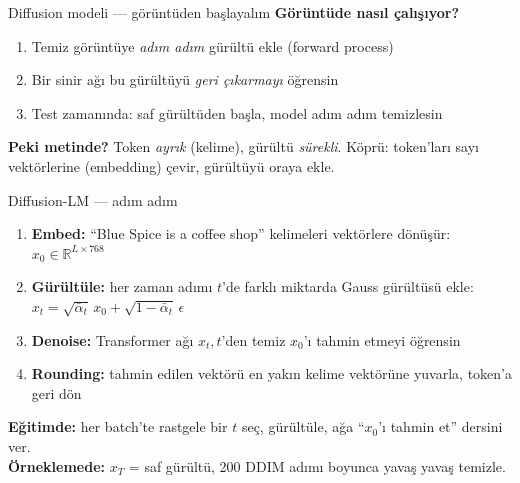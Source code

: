 \documentclass[10pt,aspectratio=169]{beamer}
\begin{document}
\begin{frame}{Diffusion modeli --- görüntüden başlayalım}
  \textbf{Görüntüde nasıl çalışıyor?}
  \vspace{0.4em}
  \begin{enumerate}
    \item Temiz görüntüye \emph{adım adım} gürültü ekle (forward process)
    \item Bir sinir ağı bu gürültüyü \emph{geri çıkarmayı} öğrensin
    \item Test zamanında: saf gürültüden başla, model adım adım temizlesin
  \end{enumerate}

  \vspace{0.6em}
  \begin{center}
  \end{center}

  \vspace{0.4em}
  \textbf{Peki metinde?} Token \emph{ayrık} (kelime), gürültü \emph{sürekli}.
  Köprü: token'ları sayı vektörlerine (embedding) çevir, gürültüyü
  oraya ekle.
\end{frame}

\begin{frame}{Diffusion-LM --- adım adım}
  \begin{enumerate}
    \item \textbf{Embed:} ``Blue Spice is a coffee shop'' kelimeleri vektörlere
          dönüşür: $x_0 \in \mathbb{R}^{L \times 768}$
    \item \textbf{Gürültüle:} her zaman adımı $t$'de farklı miktarda Gauss
          gürültüsü ekle:
          $x_t = \sqrt{\bar\alpha_t}\, x_0 + \sqrt{1-\bar\alpha_t}\, \epsilon$
    \item \textbf{Denoise:} Transformer ağı $x_t, t$'den temiz $x_0$'ı
          tahmin etmeyi öğrensin
    \item \textbf{Rounding:} tahmin edilen vektörü en yakın kelime vektörüne
          yuvarla, token'a geri dön
  \end{enumerate}

  \vspace{0.4em}
  \textbf{Eğitimde:} her batch'te rastgele bir $t$ seç, gürültüle, ağa
  ``$x_0$'ı tahmin et'' dersini ver. \\[0.3em]
  \textbf{Örneklemede:} $x_T$ = saf gürültü, 200 DDIM adımı boyunca yavaş
  yavaş temizle.
\end{frame}
\end{document}
